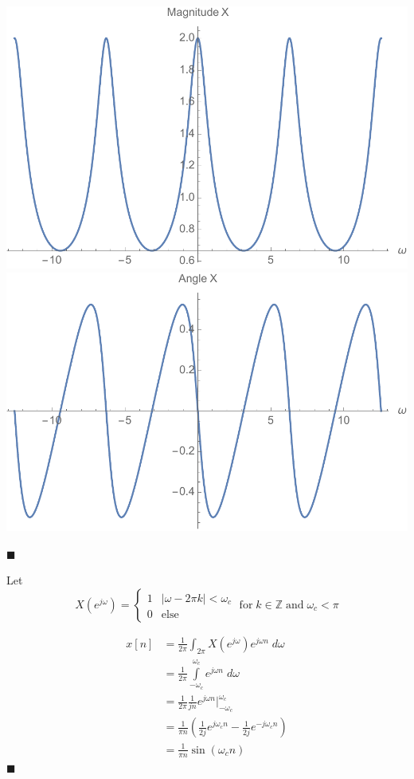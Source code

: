 \begin{example}
  \begin{center}
    \includegraphics[scale=0.5]{graphics/dtft-example1-Xmag.pdf}
    \includegraphics[scale=0.5]{graphics/dtft-example1-Xarg.pdf}
  \end{center}
  $\blacksquare$
\end{example}

\begin{example}
  Let 
  \[
  X\left(e^{j\omega}\right) = \left\{ \begin{array}{lc}
    1 & |\omega -2\pi k| < \omega_c\\
    0 & \text{else}
  \end{array}
  \right.
  \; \text{for}\; k\in\mathbb{Z} \;\text{and}\; \omega_c < \pi
  \]

  \begin{align*}
    x[n] &= \frac{1}{2\pi} \int_{2\pi} X\left(e^{j\omega}\right) e^{j\omega n} \; d\omega\\
    &= \frac{1}{2\pi} \int\limits_{-\omega_c}^{\omega_c}  e^{j\omega n} \; d\omega\\
    &= \frac{1}{2\pi} \frac{1}{jn} e^{j\omega n} \Bigg|_{-\omega_c}^{\omega_c}\\
    &= \frac{1}{\pi n} \left( \frac{1}{2j} e^{j\omega_c n} - \frac{1}{2j} e^{-j\omega_c n} \right)\\
    &= \frac{1}{\pi n} \sin(\omega_c n)
  \end{align*}
  $\blacksquare$
\end{example}

